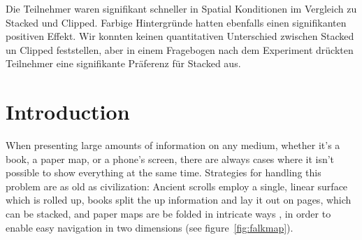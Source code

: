 \documentclass[nobib]{tufte-book} %
\begin{document}
Die Teilnehmer waren signifikant schneller in Spatial Konditionen im Vergleich zu Stacked und Clipped. Farbige Hintergr{\"u}nde hatten ebenfalls einen signifikanten positiven Effekt. Wir konnten keinen quantitativen Unterschied zwischen Stacked un Clipped feststellen, aber in einem Fragebogen nach dem Experiment dr{\"u}ckten Teilnehmer eine signifikante Pr{\"a}ferenz f{\"u}r Stacked aus.


\chapter{Introduction} %

When presenting large amounts of information on any medium, whether it's a book, a paper map, or a phone's screen, there are always cases where it isn't possible to show everything at the same time. Strategies for handling this problem are as old as civilization: Ancient scrolls employ a single, linear surface which is rolled up, books split the up information and lay it out on pages, which can be stacked, and paper maps are be folded in intricate ways \cite{angsusser2012map}, in order to enable easy navigation in two dimensions (see figure~\ref{fig:falkmap}).
\end{document}
